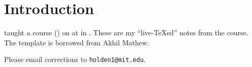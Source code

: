 \title{\thecoursename}
\author{Lectures delivered  by \thelecturer \\ Notes by \thescribe}
\date{\thesemester, \thelocation}
\renewcommand{\headrulewidth}{0pt}
\fancyhead{}
\fancyfoot{}\maketitle
\begin{center}

\end{center}
\pagestyle{fancy}

\tableofcontents

\newpage 
\section*{Introduction}

\thelecturer{} taught a course (\thecoursenum{}) on \thecoursename{} at
\thelocation{} in \thesemester{}.  
These are my ``live-\TeX ed'' notes from the course.  The template is borrowed from Akhil Mathew.





Please email corrections to
\verb=holden1@mit.edu=.

\newpage


\fancyfoot[C]{\thepage}


\renewcommand{\whattosay}{Lecture \thesection \\ }
\pagestyle{fancy}
